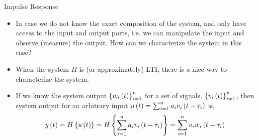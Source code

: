 \documentclass[aspectratio=169]{beamer}
\def\lp{\ensuremath\left(}
\def\rp{\ensuremath\right)}
\def\lc{\ensuremath\left\{}
\def\rc{\ensuremath\right\}}
\begin{document}
\begin{frame}{Impulse Response}
\begin{itemize}
    \item In case we do not know the exact composition of the system, and only have access to the input and output ports, i.e. we can manipulate the input and observe (measure) the output. How can we characterize the system in this case?
    \vspace{0.2cm}
    \begin{center}
    \end{center}
    \vspace{0.2cm}

    \item When the system $H$ is (or approximately) LTI, there is a nice way to characterize the system.

    \item If we know the system output $\lc w_i\lp t\rp\rc_{i=1}^n$ for a set of signals, $\lc v_i\lp t\rp\rc_{i=1}^n$, then system output for an arbitrary input $u\lp t\rp = \sum_{i=1}^n a_i v_i\lp t - \tau_i\rp$ is,
    \[ y\lp t\rp = H\lc u\lp t\rp\rc = H\lc \sum_{i=1}^n a_i v_i\lp t - \tau_i\rp\rc = \sum_{i=1}^n a_i w_i\lp t - \tau_i\rp \]
\end{itemize}
\end{frame}
\end{document}
